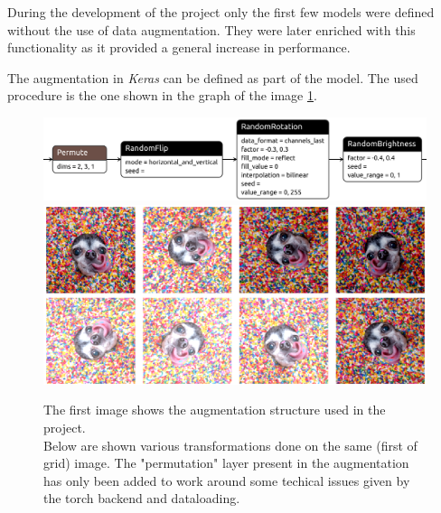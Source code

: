 
During the development of the project only the first few models were defined without the use of data augmentation.
They were later enriched with this functionality as it provided a general increase in performance.

The augmentation in \textit{Keras} can be defined as part of the model. The used procedure is the one shown in the graph of the image \ref{fig:custom_aug_proc}.

\begin{figure}[h]
    \centering
    \includegraphics[scale=0.3]{imgs/augmentation_only_model_structure}\\
    \includegraphics[scale=0.4]{imgs/aug_example_rew}
    \caption{
        The first image shows the augmentation structure used in the project.\\
        Below are shown various transformations done on the same (first of grid) image.
        The "permutation" layer present in the augmentation has only been added
    to work around some techical issues given by the torch backend and dataloading.
    }\label{fig:custom_aug_proc}
\end{figure}


